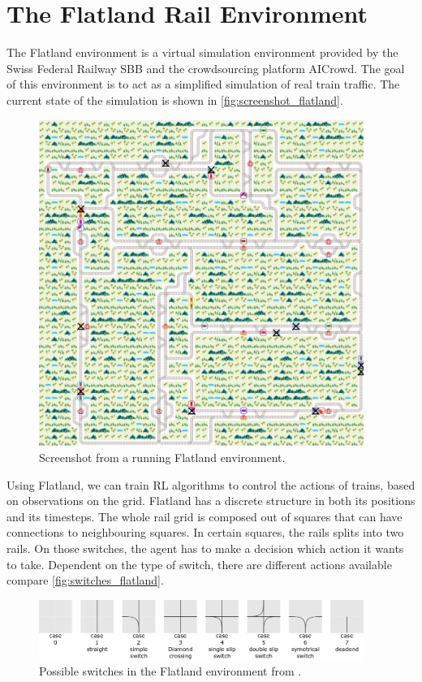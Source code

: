 \section{The Flatland Rail Environment}\label{flatland_intro}
The Flatland environment is a virtual simulation environment provided by the Swiss Federal Railway SBB and the crowdsourcing platform AICrowd.
The goal of this environment is to act as a simplified simulation of real train traffic. The current state of the simulation is shown in \autoref{fig:screenshot_flatland}.
\begin{figure}[H]
	\centering
	\includegraphics[width=300pt]{images/screenshot_flatland.png}
	\caption{Screenshot from a running Flatland environment.}
	\label{fig:screenshot_flatland}
\end{figure}
Using Flatland, we can train RL algorithms to control the actions of trains, based on observations on the grid. Flatland has a discrete structure in both its positions and its timesteps. The whole rail grid is composed out of squares that can have connections to neighbouring squares. In certain squares, the rails splits into two rails. On those switches, the agent has to make a decision which action it wants to take. Dependent on the type of switch, there are different actions available compare \autoref{fig:switches_flatland}.
\begin{figure}[H]
	\centering
	\includegraphics[width=300pt]{images/transition_nips_proposal.png}
	\caption{Possible switches in the Flatland environment from \cite{flatland_docu}.}
	\label{fig:switches_flatland}
\end{figure}
